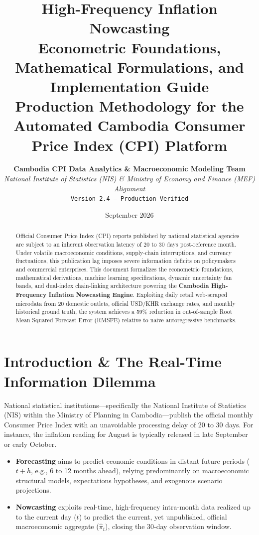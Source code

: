 \documentclass[11pt,a4paper]{article}
\title{
    \vspace{-1.5cm}
    {\Huge\bfseries\color{PrimaryNavy} High-Frequency Inflation Nowcasting}\\[0.3cm]
    {\Large\color{CobaltBlue} Econometric Foundations, Mathematical Formulations, and Implementation Guide}\\[0.2cm]
    {\normalsize\color{SlateGrey} Production Methodology for the Automated Cambodia Consumer Price Index (CPI) Platform}
}
\author{
    \textbf{Cambodia CPI Data Analytics \& Macroeconomic Modeling Team}\\
    \textit{National Institute of Statistics (NIS) \& Ministry of Economy and Finance (MEF) Alignment}\\
    \texttt{Version 2.4 --- Production Verified}
}
\date{September 2026}
\begin{document}
\maketitle
\thispagestyle{fancy}

\begin{abstract}
Official Consumer Price Index (CPI) reports published by national statistical agencies are subject to an inherent observation latency of 20 to 30 days post-reference month. Under volatile macroeconomic conditions, supply-chain interruptions, and currency fluctuations, this publication lag imposes severe information deficits on policymakers and commercial enterprises. This document formalizes the econometric foundations, mathematical derivations, machine learning specifications, dynamic uncertainty fan bands, and dual-index chain-linking architecture powering the \textbf{Cambodia High-Frequency Inflation Nowcasting Engine}. Exploiting daily retail web-scraped microdata from 20 domestic outlets, official USD/KHR exchange rates, and monthly historical ground truth, the system achieves a 59\% reduction in out-of-sample Root Mean Squared Forecast Error (RMSFE) relative to naive autoregressive benchmarks.
\end{abstract}

\vspace{0.3cm}
\tableofcontents
\newpage

\section{Introduction \& The Real-Time Information Dilemma}

National statistical institutions—specifically the National Institute of Statistics (NIS) within the Ministry of Planning in Cambodia—publish the official monthly Consumer Price Index with an unavoidable processing delay of 20 to 30 days. For instance, the inflation reading for August is typically released in late September or early October.

\begin{calloutbox}
\begin{itemize}
    \item \textbf{Forecasting} aims to predict economic conditions in distant future periods ($t + h$, e.g., 6 to 12 months ahead), relying predominantly on macroeconomic structural models, expectations hypotheses, and exogenous scenario projections.
    \item \textbf{Nowcasting} exploits real-time, high-frequency intra-month data realized up to the current day ($t$) to predict the current, yet unpublished, official macroeconomic aggregate ($\hat{\pi}_t$), closing the 30-day observation window.
\end{itemize}
\end{calloutbox}
\end{document}
